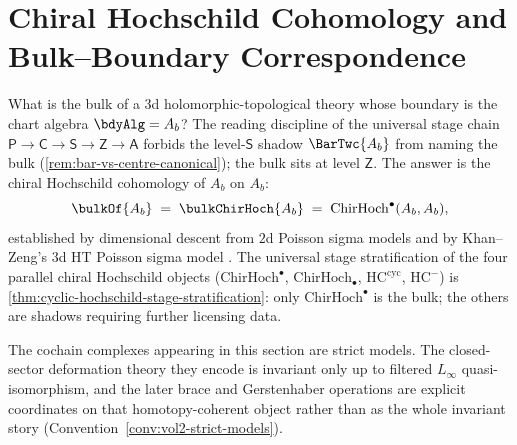 \section{Chiral Hochschild Cohomology and Bulk--Boundary Correspondence}
\label{sec:chiral_hochschild}
\label{sec:chiral_hochschild_expanded}
\label{sec:derived-center}
\label{chap:hochschild}%
\label{ch:hochschild}%
\label{ch:theory-hochschild}%

\noindent
What is the bulk of a $3$d holomorphic-topological theory whose
boundary is the chart algebra $\bdyAlg = A_b$? The reading discipline
of the universal stage chain
$\mathsf{P} \to \mathsf{C} \to \mathsf{S} \to \mathsf{Z} \to \mathsf{A}$
forbids the level-$\mathsf{S}$ shadow $\BarTwc{A_b}$ from naming the
bulk \textup(\cref{rem:bar-vs-centre-canonical}\textup); the bulk
sits at level $\mathsf{Z}$. The answer is the chiral Hochschild
cohomology of $A_b$ on $A_b$:
\[
\bulkOf{A_b}
 \;=\;
 \bulkChirHoch{A_b}
 \;=\;
 \mathrm{ChirHoch}^\bullet(A_b, A_b),
\]
established by dimensional descent from $2$d Poisson sigma models
and by Khan--Zeng's $3$d HT Poisson sigma model \cite{KZ25}. The
universal stage stratification of the four parallel chiral
Hochschild objects
\textup($\mathrm{ChirHoch}^\bullet$, $\mathrm{ChirHoch}_\bullet$,
$\mathrm{HC}^{\mathrm{cyc}}$, $\mathrm{HC}^-$\textup) is
\cref{thm:cyclic-hochschild-stage-stratification}: only
$\mathrm{ChirHoch}^\bullet$ is the bulk; the others are shadows
requiring further licensing data.

\begin{remark}
\label{rem:hochschild-linf-native}
The cochain complexes appearing in this section are strict models. The
closed-sector deformation theory they encode is invariant only up to
filtered $L_\infty$ quasi-isomorphism, and the later brace and
Gerstenhaber operations are explicit coordinates on that
homotopy-coherent object rather than as the whole invariant story
(Convention~\ref{conv:vol2-strict-models}).
\end{remark}

